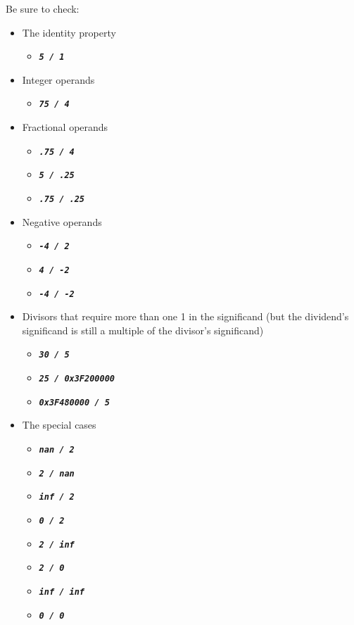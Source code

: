     Be sure to check:
    \begin{itemize}
        \item The identity property
        \begin{itemize}
            \item[] \texttt{\textbf{\textit{5 / 1}}}
        \end{itemize}
        \item Integer operands
        \begin{itemize}
            \item[] \texttt{\textbf{\textit{75 / 4}}}
        \end{itemize}
        \item Fractional operands
        \begin{itemize}
            \item[] \texttt{\textbf{\textit{.75 / 4}}}
            \item[] \texttt{\textbf{\textit{5 / .25}}}
            \item[] \texttt{\textbf{\textit{.75 / .25}}}
        \end{itemize}
        \item Negative operands
        \begin{itemize}
            \item[] \texttt{\textbf{\textit{-4 / 2}}}
            \item[] \texttt{\textbf{\textit{4 / -2}}}
            \item[] \texttt{\textbf{\textit{-4 / -2}}}
        \end{itemize}
        \item Divisors that require more than one 1 in the significand (but the dividend's significand is still a multiple of the divisor's significand)
        \begin{itemize}
            \item[] \texttt{\textbf{\textit{30 / 5}}}
            \item[] \texttt{\textbf{\textit{25 / 0x3F200000}}}
            \item[] \texttt{\textbf{\textit{0x3F480000 / 5}}}
        \end{itemize}
        \item The special cases
        \begin{itemize}
            \item[] \texttt{\textbf{\textit{nan / 2}}}
            \item[] \texttt{\textbf{\textit{2 / nan}}}
            \item[] \texttt{\textbf{\textit{inf / 2}}}
            \item[] \texttt{\textbf{\textit{0 / 2}}}
            \item[] \texttt{\textbf{\textit{2 / inf}}}
            \item[] \texttt{\textbf{\textit{2 / 0}}}
            \item[] \texttt{\textbf{\textit{inf / inf}}}
            \item[] \texttt{\textbf{\textit{0 / 0}}}
        \end{itemize}
    \end{itemize}


